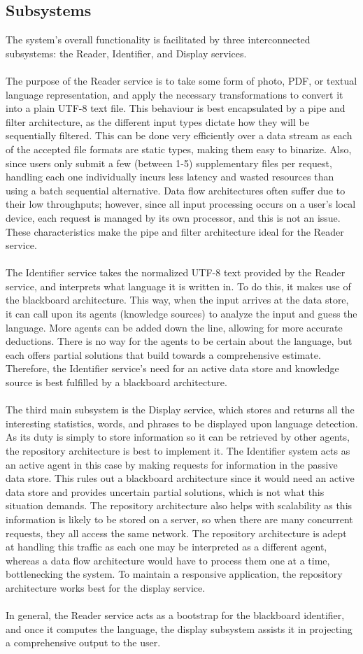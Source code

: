 \subsection{Subsystems}
\label{sub:subsystems}
The system’s overall functionality is facilitated by three interconnected subsystems: the Reader, Identifier, and Display services. 
\\
\\
The purpose of the Reader service is to take some form of photo, PDF, or textual language representation, and apply the necessary transformations to convert it into a plain UTF-8 text file. This behaviour is best encapsulated by a pipe and filter architecture, as the different input types dictate how they will be sequentially filtered. This can be done very efficiently over a data stream as each of the accepted file formats are static types, making them easy to binarize. Also, since users only submit a few (between 1-5) supplementary files per request, handling each one individually incurs less latency and wasted resources than using a batch sequential alternative. Data flow architectures often suffer due to their low throughputs; however, since all input processing occurs on a user’s local device, each request is managed by its own processor, and this is not an issue. These characteristics make the pipe and filter architecture ideal for the Reader service.
\\
\\
The Identifier service takes the normalized UTF-8 text provided by the Reader service, and interprets what language it is written in. To do this, it makes use of the blackboard architecture. This way, when the input arrives at the data store, it can call upon its agents (knowledge sources) to analyze the input and guess the language. More agents can be added down the line, allowing for more accurate deductions. There is no way for the agents to be certain about the language, but each offers partial solutions that build towards a comprehensive estimate. Therefore, the Identifier service’s need for an active data store and knowledge source is best fulfilled by a blackboard architecture.  
\\
\\
The third main subsystem is the Display service, which stores and returns all the interesting statistics, words, and phrases to be displayed upon language detection. As its duty is simply to store information so it can be retrieved by other agents, the repository architecture is best to implement it. The Identifier system acts as an active agent in this case by making requests for information in the passive data store. This rules out a blackboard architecture since it would need an active data store and provides uncertain partial solutions, which is not what this situation demands. The repository architecture also helps with scalability as this information is likely to be stored on a server, so when there are many concurrent requests, they all access the same network. The repository architecture is adept at handling this traffic as each one may be interpreted as a different agent, whereas a data flow architecture would have to process them one at a time, bottlenecking the system. To maintain a responsive application, the repository architecture works best for the display service. 
\\
\\
In general, the Reader service acts as a bootstrap for the blackboard identifier, and once it computes the language, the display subsystem assists it in projecting a comprehensive output to the user. 
